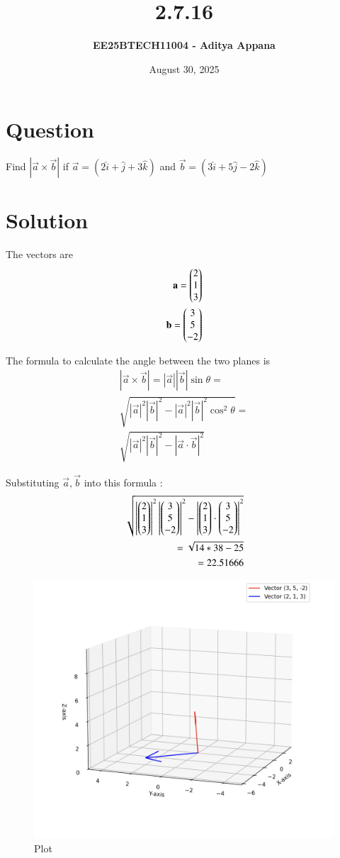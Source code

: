 \documentclass[12pt]{article}
\title{\textbf{2.7.16}}
\author{\textbf{EE25BTECH11004 - Aditya Appana}}
\date{August 30, 2025}
\begin{document}
\maketitle

\section*{Question}
Find $|\vec{a}\times \vec{b}|$ if $\vec{a} = (2\hat{i} +\hat{j} +3\hat{k})$ and  $ \vec{b}=(3\hat{i} + 5\hat{j} - 2\hat{k})$

\section*{Solution}
The vectors are
\begin{align} 
\mathbf{a} = \begin{pmatrix}2\\1\\3\end{pmatrix}\\
\mathbf{b} = \begin{pmatrix}3\\5\\-2\end{pmatrix}
\end{align}

\vspace{1cm}

The formula to calculate the angle between the two planes is
\begin{align}
|\vec{a}\times \vec{b}| = |\vec{a}||\vec{b}|\sin\theta = \\
\sqrt{|\vec{a}|^2|\vec{b}|^2 - |\vec{a}|^2|\vec{b}|^2\cos^2\theta} = \\
\sqrt{|\vec{a}|^2|\vec{b}|^2 - |\vec{a}\cdot \vec{b}|^2}
\end{align}
\newpage




Substituting $\vec{a},\vec{ b}$ into this formula :
\begin{align}
\sqrt{\left|\begin{pmatrix}2\\1\\3\end{pmatrix}\right|^2\left|\begin{pmatrix}3\\5\\-2\end{pmatrix}\right|^2 - \left|\begin{pmatrix}2\\1\\3\end{pmatrix}\cdot \begin{pmatrix}3\\5\\-2\end{pmatrix}\right|^2} \\
=\sqrt{14*38- 25}{} \\
=22.51666
\end{align}
\vspace{0.5cm}


\begin{figure}[H]
    \centering
    \includegraphics[width=0.7\columnwidth]{Figs/Figure_4.png}
    \caption{Plot}
    \label{fig:placeholder}
\end{figure}
\end{document}
